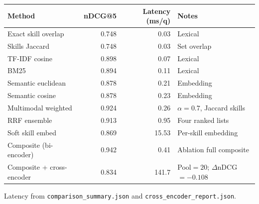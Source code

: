 \caption{Quality--latency trade-off (exhaustive evaluation, $K{=}5$).}
\label{tab:latency}
\begin{tabular}{@{}lrrl@{}}
\toprule
Method & nDCG@5 & Latency (ms/q) & Notes \\
\midrule
Exact skill overlap & 0.748 & 0.03 & Lexical \\
Skills Jaccard & 0.748 & 0.03 & Set overlap \\
TF-IDF cosine & 0.898 & 0.07 & Lexical \\
BM25 & 0.894 & 0.11 & Lexical \\
Semantic euclidean & 0.878 & 0.21 & Embedding \\
Semantic cosine & 0.878 & 0.23 & Embedding \\
Multimodal weighted & 0.924 & 0.26 & $\alpha{=}0.7$, Jaccard skills \\
RRF ensemble & 0.913 & 0.95 & Four ranked lists \\
Soft skill embed & 0.869 & 15.53 & Per-skill embedding \\
Composite (bi-encoder) & 0.942 & 0.41 & Ablation full composite \\
Composite + cross-encoder & 0.834 & 141.7 & Pool${=}20$; $\Delta$nDCG${=}{-}0.108$ \\
\bottomrule
\end{tabular}
\par\vspace{0.4em}
\footnotesize{Latency from \texttt{comparison\_summary.json} and \texttt{cross\_encoder\_report.json}. }
